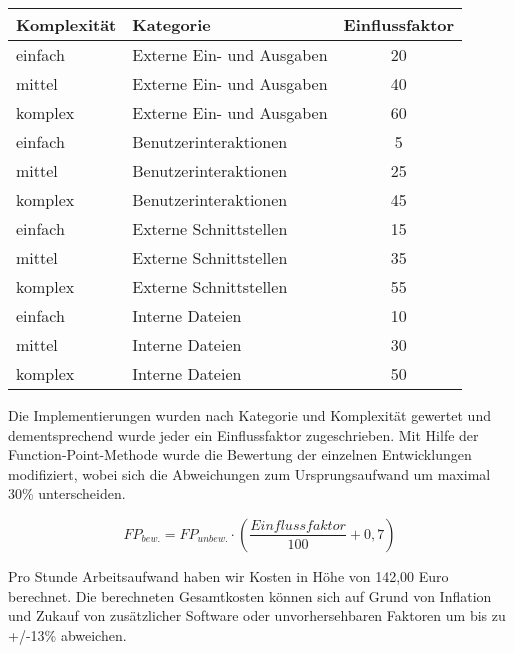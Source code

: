 \begin{center}
\begin{tabular}{llc} 
    \toprule
    Komplexität & Kategorie &  Einflussfaktor \\
    \midrule
    einfach & Externe Ein- und Ausgaben & 20 \\ 
    mittel & Externe Ein- und Ausgaben & 40 \\
    komplex & Externe Ein- und Ausgaben & 60 \\
    einfach & Benutzerinteraktionen & 5 \\ 
    mittel & Benutzerinteraktionen & 25 \\ 
    komplex & Benutzerinteraktionen & 45 \\ 
    einfach & Externe Schnittstellen & 15 \\
    mittel & Externe Schnittstellen & 35 \\ 
    komplex & Externe Schnittstellen & 55 \\ 
    einfach & Interne Dateien & 10 \\ 
    mittel & Interne Dateien & 30 \\ 
    komplex & Interne Dateien & 50 \\
    \bottomrule
\end{tabular}
\end{center}

Die Implementierungen wurden nach Kategorie und Komplexität gewertet und dementsprechend wurde jeder ein Einflussfaktor zugeschrieben. Mit Hilfe der Function-Point-Methode wurde die Bewertung der einzelnen Entwicklungen modifiziert, wobei sich die Abweichungen zum Ursprungsaufwand um maximal 30\% unterscheiden. 

\begin{equation}
    FP_{bew.} = FP_{unbew.} \cdot (\frac{Einflussfaktor}{100} + 0,7)
\end{equation}

Pro Stunde Arbeitsaufwand haben wir Kosten in Höhe von 142,00 Euro berechnet. Die berechneten Gesamtkosten können sich auf Grund von Inflation und Zukauf von zusätzlicher Software oder unvorhersehbaren Faktoren um bis zu +/-13\% abweichen.


